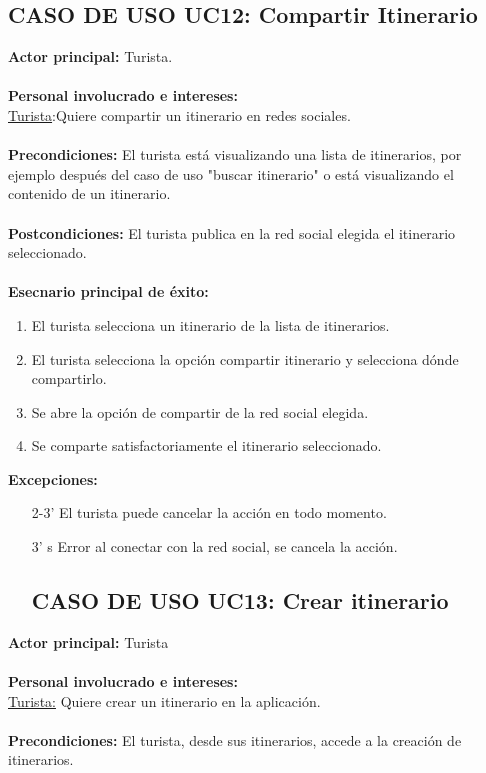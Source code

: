\documentclass[11pt]{article}
\begin{document}
\subsection*{\textbf{CASO DE USO UC12: Compartir Itinerario}  }
\textbf{Actor principal:} Turista.\\
\\
\textbf{Personal involucrado e intereses: }\\
\underline{Turista}:Quiere compartir un itinerario en redes sociales.
\\\\
\textbf{Precondiciones:} El turista está visualizando una lista de itinerarios, por ejemplo después del caso de uso "buscar itinerario" o está visualizando el contenido de un itinerario.\\
\\
\textbf{Postcondiciones:} El turista publica en la red social elegida el itinerario seleccionado.\\
\\
\textbf{Esecnario principal de éxito:}
\begin{enumerate}
\item El turista selecciona un itinerario de la lista de itinerarios.
\item El turista selecciona la opción compartir itinerario y selecciona dónde compartirlo.
\item Se abre la opción de compartir de la red social elegida.
\item Se comparte satisfactoriamente el itinerario seleccionado.
\end{enumerate}
\textbf{Excepciones:}
\begin{enumerate}
\item[2-3'] El turista puede cancelar la acción en todo momento.
\item[3']s Error al conectar con la red social, se cancela la acción.
\subsection*{\textbf{CASO DE USO UC13:} Crear itinerario }
\end{enumerate}
\textbf{Actor principal:} Turista\\
\\
\textbf{Personal involucrado e intereses: }\\\underline{Turista:} Quiere crear un itinerario en la aplicación.\\
\\
\textbf{Precondiciones:} El turista, desde sus itinerarios, accede a la creación de itinerarios.\\
\end{document}
